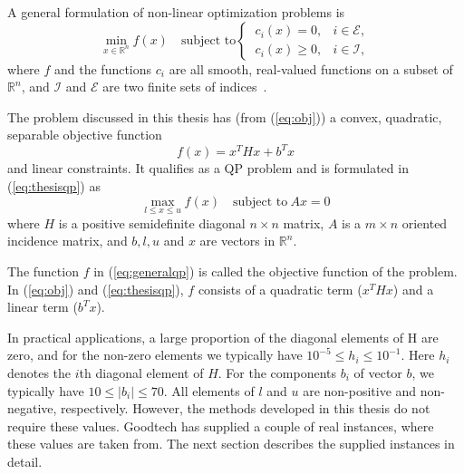 A general formulation of non-linear optimization problems is
\begin{equation}
    \label{eq:generalqp}
    \min_{x \in \mathbb{R}^n} f(x) \quad \textrm{subject to}
    \begin{cases}
        ~c_i(x) = 0,   & i \in \mathcal{E}, \\
        ~c_i(x) \ge 0, & i \in \mathcal{I},
    \end{cases}
\end{equation}
where $f$ and the functions $c_i$ are all smooth, real-valued functions on a
subset of $\mathbb{R}^n$, and $\mathcal{I}$ and $\mathcal{E}$ are two finite
sets of indices~\cite{nocedal}.

The problem discussed in this thesis has (from (\ref{eq:obj})) a convex,
quadratic, separable objective function
\[
    f(x) = x^T H x + b^T x
\]
and linear constraints. It qualifies as a QP problem and is formulated in
(\ref{eq:thesisqp}) as
\[
    \max_{l \le x \le u} f(x)\quad\textrm{subject to}~Ax = 0
\]
where $H$ is a positive semidefinite diagonal $n \times n$ matrix, $A$ is a
$m \times n$ oriented incidence matrix, and $b, l, u$ and $x$ are vectors in
$\mathbb{R}^n$.

The function $f$ in (\ref{eq:generalqp}) is called the objective function of
the problem. In (\ref{eq:obj}) and (\ref{eq:thesisqp}), $f$ consists of a
quadratic term ($x^T H x$) and a linear term ($b^T x$).

In practical applications, a large proportion of the diagonal elements of H are
zero, and for the non-zero elements we typically have
$10^{-5} \le h_i \le 10^{-1}$. Here $h_i$ denotes the $i$th diagonal element of
$H$. For the components $b_i$ of vector $b$, we typically have
$10 \le |b_i| \le 70$. All elements of $l$ and $u$ are non-positive 
and non-negative, respectively. However, the methods developed in this thesis
do not require these values. Goodtech has supplied a couple of real instances,
where these values are taken from. The next section describes the supplied
instances in detail.
